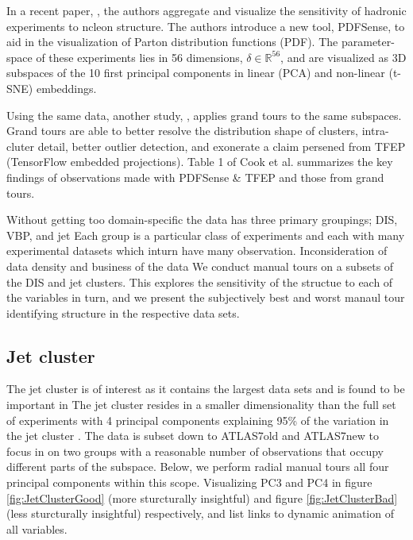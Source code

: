 \documentclass{monashthesis}
\begin{document}
In a recent paper, \textcite{wang_mapping_2018}, the authors aggregate
and visualize the sensitivity of hadronic experiments to ncleon
structure. The authors introduce a new tool, PDFSense, to aid in the
visualization of Parton distribution functions (PDF). The
parameter-space of these experiments lies in 56 dimensions,
\(\delta \in \mathbb{R}^{56}\), and are visualized as 3D subspaces of
the 10 first principal components in linear (PCA) and non-linear (t-SNE)
embeddings.

Using the same data, another study, \textcite{cook_dynamical_2018},
applies grand tours to the same subspaces. Grand tours are able to
better resolve the distribution shape of clusters, intra-cluter detail,
better outlier detection, and exonerate a claim persened from TFEP
(TensorFlow embedded projections). Table 1 of Cook et al. summarizes the
key findings of observations made with PDFSense \& TFEP and those from
grand tours.

Without getting too domain-specific the data has three primary
groupings; DIS, VBP, and jet Each group is a particular class of
experiments and each with many experimental datasets which inturn have
many observation. Inconsideration of data density and business of the
data We conduct manual tours on a subsets of the DIS and jet clusters.
This explores the sensitivity of the structue to each of the variables
in turn, and we present the subjectively best and worst manaul tour
identifying structure in the respective data sets.

\subsection{Jet cluster}\label{jet-cluster}

The jet cluster is of interest as it contains the largest data sets and
is found to be important in \textcite{wang_mapping_2018} The jet cluster
resides in a smaller dimensionality than the full set of experiments
with 4 principal components explaining 95\% of the variation in the jet
cluster \autocite{cook_dynamical_2018}. The data is subset down to
ATLAS7old and ATLAS7new to focus in on two groups with a reasonable
number of observations that occupy different parts of the subspace.
Below, we perform radial manual tours all four principal components
within this scope. Visualizing PC3 and PC4 in figure
\ref{fig:JetClusterGood} (more sturcturally insightful) and figure
\ref{fig:JetClusterBad} (less sturcturally insightful) respectively, and
list links to dynamic animation of all variables.
\end{document}
